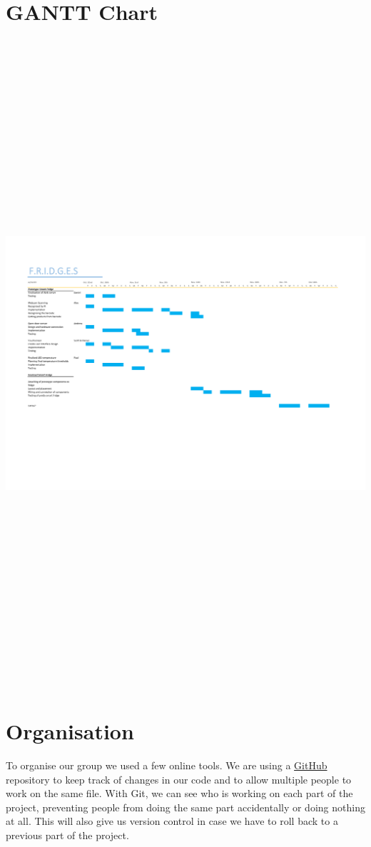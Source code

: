 \documentclass[10pt]{article}
\begin{document}
{{\section{GANTT Chart}
\includegraphics[height=24cm, width=24cm,angle=90]{GANTT.pdf}

\newpage

\section{Organisation}
To organise our group we used a few online tools. We are using a \href{https://github.com/pmcgurk/CS413}{GitHub} repository to keep track of changes in our code and to allow multiple people to work on the same file. With Git, we can see who is working on each part of the project, preventing people from doing the same part accidentally or doing nothing at all. This will also give us version control in case we have to roll back to a previous part of the project.

}}
\end{document}
